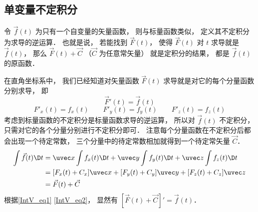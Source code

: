 


\subsection{单变量不定积分}
令 $\vec f(t)$ 为只有一个自变量的矢量函数， 则与标量函数类似， 定义其不定积分为求导的逆运算． 也就是说， 若能找到 $\vec F(t)$， 使得 $\vec F(t)$ 对 $t$ 求导就是 $\vec f(t)$， 那么 $\vec F(t) + \vec C$ （$\vec C$ 为任意常矢量） 就是定积分的结果， 都是 $\vec f(t)$ 的原函数．

在直角坐标系中， 我们已经知道对矢量函数 $\vec F(t)$ 求导就是对它的每个分量函数分别求导， 即
\begin{equation}\label{IntV_eq1}
\vec F'(t) = \vec f(t)
\end{equation}
\begin{equation}\label{IntV_eq2}
F'_x(t) = f_x(t) \qquad F'_y(t) = f_y(t) \qquad F'_z(t) = f_z(t)
\end{equation}
考虑到标量函数的不定积分是标量函数求导的逆运算， 所以对 $\vec f(t)$ 不定积分， 只需对它的各个分量分别进行不定积分即可． 注意每个分量函数在不定积分后都会出现一个待定常数， 三个分量中的待定常数相加就得到一个待定常矢量 $\vec C$．
\begin{equation}\begin{aligned}
\int \vec f(t) \D t &= \uvec x \int f_x(t) \D t + \uvec y \int f_y(t) \D t + \uvec z \int f_z(t) \D t\\
&= [F_x(t)+C_x]\uvec x + [F_y(t)+C_y]\uvec y + [F_z(t)+C_z]\uvec z\\
&= \vec F(t) + \vec C
\end{aligned}\end{equation}
根据\autoref{IntV_eq1} \autoref{IntV_eq2}， 显然有 $[\vec F(t) + \vec C]' = \vec f(t)$．

